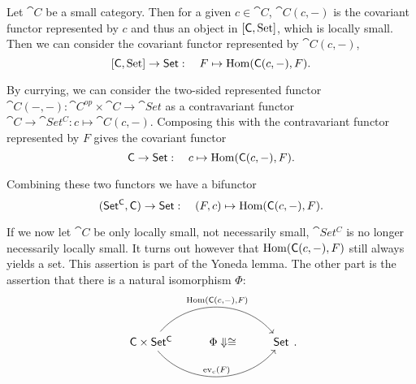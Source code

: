 Let $\cat{C}$ be a small category. Then for a given $c\in\cat{C}$, $\cat{C}(c,-)$ is the covariant functor represented by $c$ and thus an object in $[\mathsf{C},\mathsf{\operatorname{Set}}]$, which is locally small. Then we can consider the covariant functor represented by $\cat{C}(c,-)$,
\[ [\mathsf{C},\mathsf{\operatorname{Set}}]\to \mathsf{Set}:\quad F \mapsto \operatorname{Hom}(\mathsf{C}(c,-), F). \]

By currying, we can consider the two-sided represented functor $\cat{C}(-,-): \cat{C^{op}}\times\cat{C}\to \cat{Set}$ as a contravariant functor $\cat{C} \to \cat{Set^C}: c\mapsto \cat{C}(c,-)$. Composing this with the contravariant functor represented by $F$ gives the covariant functor
\[ \mathsf{C} \to \mathsf{Set}:\quad c \mapsto \operatorname{Hom}(\mathsf{C}(c,-), F). \]

Combining these two functors we have a bifunctor
\[ (\mathsf{Set^C}, \mathsf{C}) \to \mathsf{Set}: \quad(F,c) \mapsto \operatorname{Hom}(\mathsf{C}(c,-), F). \]

If we now let $\cat{C}$ be only locally small, not necessarily small, $\cat{Set^C}$ is no longer necessarily locally small. It turns out however that $\operatorname{Hom}(\mathsf{C}(c,-), F)$ still always yields a set. This assertion is part of the Yoneda lemma. The other part is the assertion that there is a natural isomorphism $\Phi$:
\[ \begin{tikzcd}
\cat{C}\times\cat{Set^C} \ar[rr, bend left=50, "{\Hom(\cat{C}(c,-), F)}"] \ar[rr, bend right=50, "\evalMap_c(F)"] & \Phi\Downarrow\cong & \cat{Set}
\end{tikzcd}. \]

